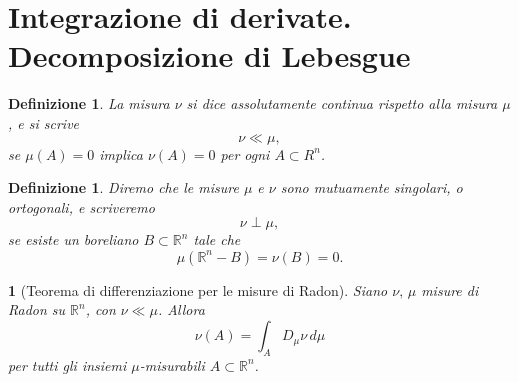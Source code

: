 \documentclass[a4paper,10pt,openright,oneside]{book}
\theoremstyle{theoremstyle}
\theoremstyle{theoremstylewoheader}
\newtheorem{teorema2}[teorema]{}
\theoremstyle{theoremstyle}
\newtheorem{definizione}[teorema]{Definizione}
\theoremstyle{proofsecstyle}
\theoremstyle{nonumberplain}
\newcommand{\RR}{\ensuremath{\mathbb{R}}}
\newcommand{\Der}[2]{\ensuremath{D_#2 #1}}
\begin{document}
\section{Integrazione di derivate. Decomposizione di Lebesgue}

\begin{definizione}
\label{def:misura_assolutamente_continua}
La misura $\nu$ si dice \emph{assolutamente continua} rispetto alla misura $\mu$, e si scrive
\[
\nu \ll \mu,
\]
se $\mu(A) = 0$ implica $\nu(A) = 0$ per ogni $A \subset R^n$.
\end{definizione}

\begin{definizione}
\label{def:misure_mutuamente_singolari}
Diremo che le misure $\mu$ e $\nu$ sono \emph{mutuamente singolari}, o \emph{ortogonali}, e scriveremo
\[
\nu \perp \mu,
\]
se esiste un boreliano $B \subset \mathbb{R}^n$ tale che
\[
\mu(\mathbb{R}^n - B) = \nu(B) = 0.
\]
\end{definizione}

\begin{teorema2}[Teorema di differenziazione per le misure di Radon]
\label{thm:differenziazione_misure_radon}
Siano $\nu,\, \mu$ misure di Radon su $\RR^n$, con $\nu \ll \mu$. Allora
\[
\nu(A) = \int_A \Der{\nu}{\mu}\, d\mu
\]
per tutti gli insiemi $\mu$-misurabili $A \subset \RR^n$.
\end{teorema2}
\end{document}
